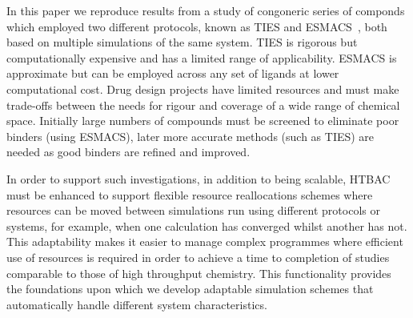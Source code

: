 In this paper we reproduce results from a study of  congoneric series of componds which employed 
two different protocols, known as TIES and
ESMACS~\cite{Wan2017brd4, Bhati2017}, both based on 
multiple simulations of the same system.
TIES is rigorous but computationally expensive and has a limited range of 
applicability.
ESMACS is approximate but can be employed across any set of ligands at lower computational cost.
Drug design projects have limited resources
and must make trade-offs between the needs for rigour and coverage of a wide
range of chemical space. Initially large numbers of compounds must be screened
to eliminate poor binders (using ESMACS), later more accurate methods (such as
TIES) are needed as good binders are refined and improved. %

In order to support such
investigations, in addition to being scalable, HTBAC must be enhanced to
support flexible resource reallocations schemes where resources can be moved
between simulations run using different protocols or systems, for example,
when one calculation has converged whilst another has not. This adaptability
makes it easier to manage complex programmes where efficient use of resources
is required in order to achieve a time to completion of studies comparable to
those of high throughput chemistry. 
This functionality provides the
foundations upon which we develop adaptable simulation schemes that
automatically handle different system characteristics.

